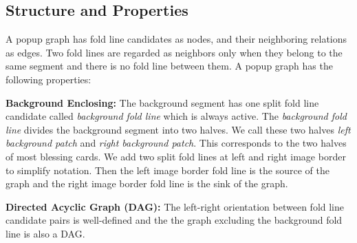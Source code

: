 
\subsection{Structure and Properties} \label{popup_graph_structure}




A popup graph has fold line candidates as nodes, and their neighboring relations as edges. Two fold lines are regarded as neighbors only when they belong to the same segment and there is no fold line between them. A popup graph has the following properties:

\textbf{Background Enclosing: } The background segment has one split fold line candidate called \textit{background fold line} which is always active. The \textit{background fold line} divides the background segment into two halves. We call these two halves \textit{left background patch} and \textit{right background patch}. This corresponds to the two halves of most blessing cards.  We add two split fold lines at left and right image border to simplify notation. Then the left image border fold line is the source of the graph and the right image border fold line is the sink of the graph.

\textbf{Directed Acyclic Graph (DAG): } The left-right orientation between fold line candidate pairs is well-defined and the the graph excluding the background fold line is also a DAG.


